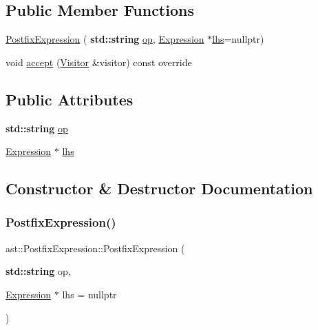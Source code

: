 \subsection*{Public Member Functions}
\begin{DoxyCompactItemize}
\item 
\hyperlink{structast_1_1_postfix_expression_a05ffefe65c8da2f27ed738472949498e}{Postfix\+Expression} (\textbf{ std\+::string} \hyperlink{structast_1_1_postfix_expression_ad66faf9468db248029f996a097d26522}{op}, \hyperlink{structast_1_1_expression}{Expression} $\ast$\hyperlink{structast_1_1_postfix_expression_ab98b86399ad2ee698117a00cf1457be1}{lhs}=nullptr)
\item 
void \hyperlink{structast_1_1_postfix_expression_a4437b8f71db7d65b5a8b0126917065c1}{accept} (\hyperlink{structast_1_1_visitor}{Visitor} \&visitor) const override
\end{DoxyCompactItemize}
\subsection*{Public Attributes}
\begin{DoxyCompactItemize}
\item 
\textbf{ std\+::string} \hyperlink{structast_1_1_postfix_expression_ad66faf9468db248029f996a097d26522}{op}
\item 
\hyperlink{structast_1_1_expression}{Expression} $\ast$ \hyperlink{structast_1_1_postfix_expression_ab98b86399ad2ee698117a00cf1457be1}{lhs}
\end{DoxyCompactItemize}


\subsection{Constructor \& Destructor Documentation}
\mbox{\label{structast_1_1_postfix_expression_a05ffefe65c8da2f27ed738472949498e}} 
\subsubsection{\texorpdfstring{Postfix\+Expression()}{PostfixExpression()}}
{\footnotesize\ttfamily ast\+::\+Postfix\+Expression\+::\+Postfix\+Expression (\begin{DoxyParamCaption}\item[{\textbf{ std\+::string}}]{op,  }\item[{\hyperlink{structast_1_1_expression}{Expression} $\ast$}]{lhs = {\ttfamily nullptr} }\end{DoxyParamCaption})\hspace{0.3cm}{\ttfamily [inline]}}



